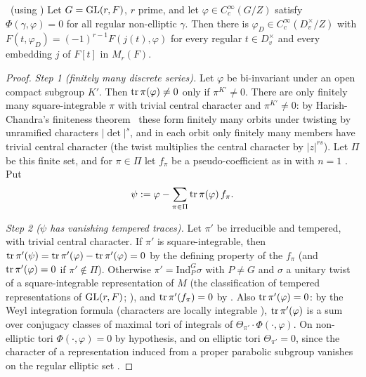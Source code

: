 \begin{lemma}\label{II:lem:L2}\ (using \Ev)
Let $G=\mathrm{GL}(r,F)$, $r$ prime, and let $\varphi\in C_c^\infty(G/Z)$ satisfy $\Phi(\gamma,\varphi)=0$ for all regular non-elliptic $\gamma$. Then there is $\varphi_D\in C_c^\infty(D_v^\times/Z)$ with $F(t,\varphi_D)=(-1)^{r-1}F(j(t),\varphi)$ for every regular $t\in D_v^\times$ and every embedding $j$ of $F[t]$ in $M_r(F)$.
\end{lemma}
\begin{proof}
\emph{Step 1 (finitely many discrete series).} Let $\varphi$ be bi-invariant under an open compact subgroup $K'$. Then $\operatorname{tr}\pi(\varphi)\ne0$ only if $\pi^{K'}\ne0$. There are only finitely many square-integrable $\pi$ with trivial central character and $\pi^{K'}\ne0$: by Harish-Chandra's finiteness theorem \cite[Th\'eor\`eme~VIII.1.2]{Wal03} \Ev\ these form finitely many orbits under twisting by unramified characters $|\det|^s$, and in each orbit only finitely many members have trivial central character (the twist multiplies the central character by $|z|^{rs}$). Let $\Pi$ be this finite set, and for $\pi\in\Pi$ let $f_\pi$ be a pseudo-coefficient as in \cite[\S25.1, Theorem]{FK86} with $n=1$ \Ev. Put
\[ \psi:=\varphi-\sum_{\pi\in\Pi}\operatorname{tr}\pi(\varphi)\,f_\pi . \]

\emph{Step 2 ($\psi$ has vanishing tempered traces).} Let $\pi'$ be irreducible and tempered, with trivial central character. If $\pi'$ is square-integrable, then $\operatorname{tr}\pi'(\psi)=\operatorname{tr}\pi'(\varphi)-\operatorname{tr}\pi'(\varphi)=0$ by the defining property of the $f_\pi$ (and $\operatorname{tr}\pi'(\varphi)=0$ if $\pi'\notin\Pi$). Otherwise $\pi'=\mathrm{Ind}_P^G\sigma$ with $P\ne G$ and $\sigma$ a unitary twist of a square-integrable representation of $M$ (the classification of tempered representations of $\mathrm{GL}(r,F)$; \cite[\S9]{Zel80}), and $\operatorname{tr}\pi'(f_\pi)=0$ by \cite[\S25.1]{FK86}. Also $\operatorname{tr}\pi'(\varphi)=0$: by the Weyl integration formula (characters are locally integrable \cite[\S13]{FK86}), $\operatorname{tr}\pi'(\varphi)$ is a sum over conjugacy classes of maximal tori of integrals of $\Theta_{\pi'}\cdot\Phi(\cdot,\varphi)$. On non-elliptic tori $\Phi(\cdot,\varphi)=0$ by hypothesis, and on elliptic tori $\Theta_{\pi'}=0$, since the character of a representation induced from a proper parabolic subgroup vanishes on the regular elliptic set \cite{vD72} \Ev.


\end{proof}
